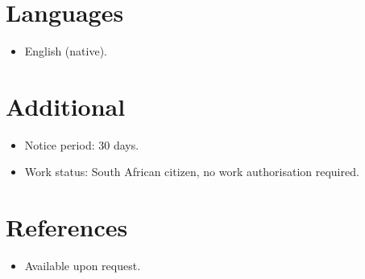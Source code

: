 \documentclass[11pt,a4paper,sans]{moderncv}
\begin{document}

\section{Languages}
\vspace{1pt}
\begin{itemize}
\item English (native).
\end{itemize}


\section{Additional}
\vspace{1pt}
\begin{itemize}
\item Notice period: 30 days.
\item Work status: South African citizen, no work authorisation required.
\end{itemize}


\section{References}
\vspace{1pt}
\begin{itemize}
\item{Available upon request.}
\end{itemize}
\end{document}
